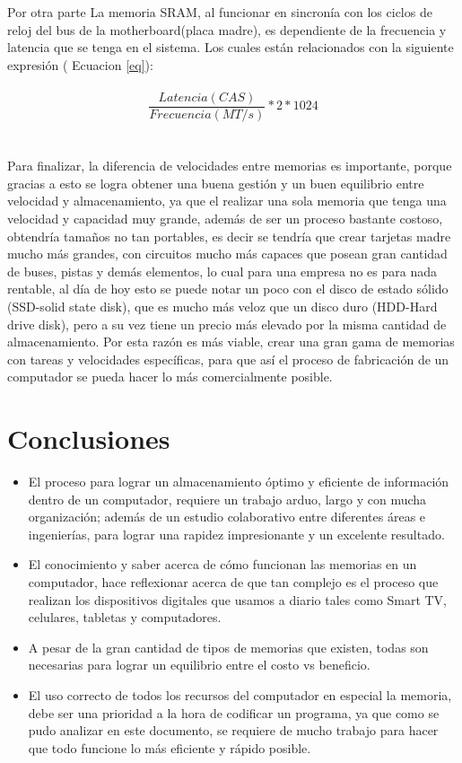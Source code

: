 \documentclass{article}
\begin{document}
Por otra parte La memoria SRAM, al funcionar en sincronía con los ciclos de reloj del bus de la motherboard(placa madre), es dependiente de la frecuencia y latencia que se tenga en el sistema. Los cuales están relacionados con la siguiente expresión ( Ecuacion \ref{eq}): \\\\


\begin{equation}
\frac{Latencia(CAS)}{Frecuencia(MT/s)}*2*1024 
\label{eq}
\end{equation}
\\\\
Para finalizar, la diferencia de velocidades entre memorias es importante, porque gracias a esto se logra obtener una buena gestión y un buen equilibrio entre velocidad y almacenamiento, ya que el realizar una sola memoria que tenga una velocidad y capacidad muy grande, además de ser un proceso bastante costoso, obtendría tamaños no tan portables, es decir se tendría que crear tarjetas madre mucho más grandes, con circuitos mucho más capaces que posean gran cantidad de buses, pistas y demás elementos, lo cual para una empresa no es para nada rentable, al día de hoy esto se puede notar un poco con el disco de estado sólido (SSD-solid state disk), que es mucho más veloz que un disco duro (HDD-Hard drive disk), pero a su vez tiene un precio más elevado por la misma cantidad de almacenamiento. Por esta razón es más viable, crear una gran gama de memorias con tareas y velocidades específicas, para que así el proceso de fabricación de un computador se pueda hacer lo más comercialmente posible.


\section{Conclusiones}\label{conclusiones}
\begin{itemize}
    \item El proceso para lograr un almacenamiento óptimo y eficiente de información dentro de un computador, requiere un trabajo arduo, largo y con mucha organización; además de un estudio colaborativo entre diferentes áreas e ingenierías, para lograr una rapidez impresionante y un excelente resultado.
    \item El conocimiento y saber acerca de cómo funcionan las memorias en un computador, hace reflexionar acerca de que tan complejo es el proceso que realizan los dispositivos digitales que usamos a diario tales como Smart TV, celulares, tabletas y computadores.
    \item A pesar de la gran cantidad de tipos de memorias que existen, todas son necesarias para lograr un equilibrio entre el costo vs beneficio.
    \item El uso correcto de todos los recursos del computador en especial la memoria, debe ser una prioridad a la hora de codificar un programa, ya que como se pudo analizar en este documento, se requiere de mucho trabajo para hacer que todo funcione lo más eficiente y rápido posible.

\end{itemize}

\newpage
\noindent

\noindent

\end{document}
